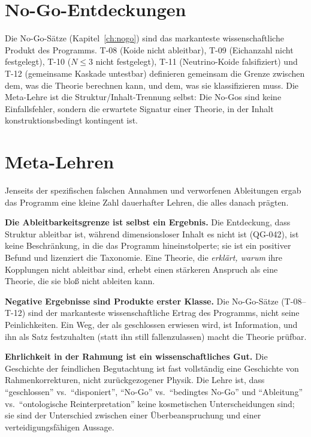 \documentclass[10pt,twoside,openany]{book}
\begin{document}
\section{No-Go-Entdeckungen}

Die No-Go-Sätze (Kapitel~\ref{ch:nogo}) sind das markanteste wissenschaftliche Produkt
des Programms. T-08 (Koide nicht ableitbar), T-09 (Eichanzahl nicht festgelegt), T-10
($N\le3$ nicht festgelegt), T-11 (Neutrino-Koide falsifiziert) und T-12 (gemeinsame
Kaskade untestbar) definieren gemeinsam die Grenze zwischen dem, was die Theorie
berechnen kann, und dem, was sie klassifizieren muss. Die Meta-Lehre ist die
Struktur/Inhalt-Trennung selbst: Die No-Gos sind keine Einfallsfehler, sondern die
erwartete Signatur einer Theorie, in der Inhalt konstruktionsbedingt kontingent ist.

\section{Meta-Lehren}

Jenseits der spezifischen falschen Annahmen und verworfenen Ableitungen ergab das Programm
eine kleine Zahl dauerhafter Lehren, die alles danach prägten.

\textbf{Die Ableitbarkeitsgrenze ist selbst ein Ergebnis.} Die Entdeckung, dass Struktur
ableitbar ist, während dimensionsloser Inhalt es nicht ist (QG-042), ist keine
Beschränkung, in die das Programm hineinstolperte; sie ist ein positiver Befund und
lizenziert die Taxonomie. Eine Theorie, die \emph{erklärt, warum} ihre Kopplungen nicht
ableitbar sind, erhebt einen stärkeren Anspruch als eine Theorie, die sie bloß nicht
ableiten kann.

\textbf{Negative Ergebnisse sind Produkte erster Klasse.} Die No-Go-Sätze (T-08--T-12)
sind der markanteste wissenschaftliche Ertrag des Programms, nicht seine Peinlichkeiten.
Ein Weg, der als geschlossen erwiesen wird, ist Information, und ihn als Satz
festzuhalten (statt ihn still fallenzulassen) macht die Theorie prüfbar.

\textbf{Ehrlichkeit in der Rahmung ist ein wissenschaftliches Gut.} Die Geschichte der
feindlichen Begutachtung ist fast vollständig eine Geschichte von Rahmenkorrekturen, nicht
zurückgezogener Physik. Die Lehre ist, dass ``geschlossen'' vs.\ ``disponiert'',
``No-Go'' vs.\ ``bedingtes No-Go'' und ``Ableitung'' vs.\ ``ontologische
Reinterpretation'' keine kosmetischen Unterscheidungen sind; sie sind der Unterschied
zwischen einer Überbeanspruchung und einer verteidigungsfähigen Aussage.
\end{document}
